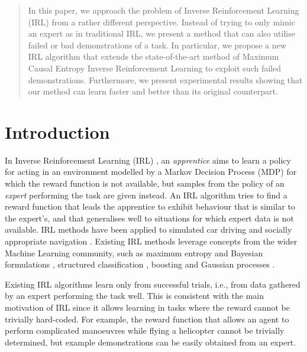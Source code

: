 \documentclass[conference]{IEEEtran}
\begin{document}
\begin{abstract}
In this paper, we approach the problem of Inverse Reinforcement Learning (IRL) from a rather different perspective. Instead of trying to only mimic an expert as in traditional IRL, we present a method that can also utilise failed or bad demonstrations of a task. In particular, we propose a new IRL algorithm that extends the state-of-the-art method of Maximum Causal Entropy Inverse Reinforcement Learning to exploit such failed demonstrations. Furthermore, we present experimental results showing that our method can learn faster and better than its original counterpart.
\end{abstract}

\IEEEpeerreviewmaketitle

\section{Introduction}
In Inverse Reinforcement Learning (IRL) \cite{ng2000algorithms}, an \emph{apprentice} aims to learn a policy for acting in an environment modelled by a Markov Decision Process (MDP) for which the reward function is not available, but samples from the policy of an \emph{expert} performing the task are given instead. An IRL algorithm tries to find a reward function that leads the apprentice to exhibit behaviour that is similar to the expert's, and that generalises well to situations for which expert data is not available. %
IRL methods have been applied to simulated car driving \cite{abbeel2004apprenticeship} and socially appropriate navigation \cite{henry2010learning,vasquez2014inverse}. Existing IRL methods leverage concepts from the wider Machine Learning community, such as maximum entropy \cite{ziebart2008maximum} and Bayesian formulations \cite{ramachandran2007bayesian}, structured classification \cite{ratliff2006maximum}, boosting \cite{ratliff2007boosting} and Gaussian processes \cite{levine2011nonlinear}.

Existing IRL algorithms learn only from successful trials, i.e., from data gathered by an expert performing the task well. This is consistent with the main motivation of IRL since it allows learning in tasks where the reward cannot be trivially hard-coded.  For example, the reward function that allows an agent to perform complicated manoeuvres while flying a helicopter cannot be trivially determined, but example demonstrations can be easily obtained from an expert.
\end{document}

